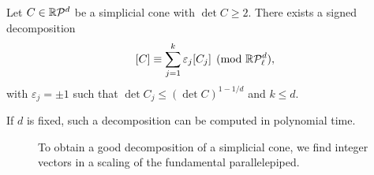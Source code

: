 \begin{lemma}
  \label{lemma:signed-decomposition-determinants}
  Let $C \in \mathbb{R}\mathcal{P}^d$ be a simplicial cone with $\det C \geq 2$.
  There exists a signed decomposition
  \[
    [C] \equiv \sum_{j=1}^k \varepsilon_j [C_j] \pmod{\mathbb{R}\mathcal{P}_\ell^d},
  \]
  with $\varepsilon_j = \pm1$ such that $\det C_j \leq (\det C)^{1-1/d}$ and $k \leq d$.

  If $d$ is fixed, such a decomposition can be computed in polynomial time.
\end{lemma}
\begin{figure}
  \begin{center}
  \end{center}
  \caption{To obtain a good decomposition of a simplicial cone,
    we find integer vectors in a scaling of the fundamental parallelepiped.}
  \label{fig:signed-decomposition-determinants}
\end{figure}
